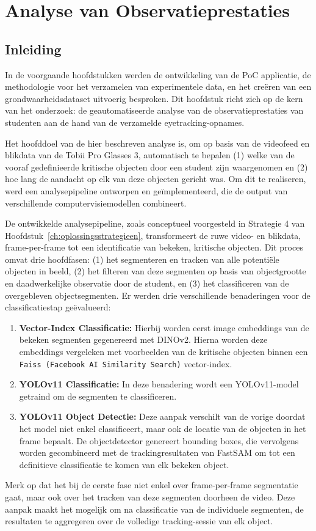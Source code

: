 \chapter{Analyse van Observatieprestaties}
\label{ch:analyse}

\section{Inleiding}

In de voorgaande hoofdstukken werden de ontwikkeling van de PoC applicatie, de methodologie voor het verzamelen 
van experimentele data, en het creëren van een grondwaarheidsdataset uitvoerig besproken. 
Dit hoofdstuk richt zich op de kern van het onderzoek: de geautomatiseerde analyse van de 
observatieprestaties van studenten aan de hand van de verzamelde eyetracking-opnames.

Het hoofddoel van de hier beschreven analyse is, om op basis van de videofeed en blikdata van de Tobii Pro Glasses 3, 
automatisch te bepalen (1) welke van de vooraf gedefinieerde kritische objecten door een student zijn waargenomen en (2) 
hoe lang de aandacht op elk van deze objecten gericht was. 
Om dit te realiseren, werd een analysepipeline ontworpen en geïmplementeerd, die de output van verschillende computervisiemodellen combineert.

De ontwikkelde analysepipeline, zoals conceptueel voorgesteld in Strategie 4 van Hoofdstuk~\ref{ch:oplossingsstrategieen}, 
transformeert de ruwe video- en blikdata, frame-per-frame tot een identificatie van bekeken, kritische objecten. 
Dit proces omvat drie hoofdfasen: (1) het segmenteren en tracken van alle potentiële objecten in beeld, 
(2) het filteren van deze segmenten op basis van objectgrootte en daadwerkelijke observatie door de student, en 
(3) het classificeren van de overgebleven objectsegmenten. 
Er werden drie verschillende benaderingen voor de classificatiestap geëvalueerd:
\begin{enumerate}
  \item \textbf{Vector-Index Classificatie:} Hierbij worden eerst image embeddings van de bekeken segmenten gegenereerd met DINOv2.
  Hierna worden deze embeddings vergeleken met voorbeelden van de kritische objecten binnen een \texttt{Faiss (Facebook AI Similarity Search)} vector-index.
  \item \textbf{YOLOv11 Classificatie:} In deze benadering wordt een YOLOv11-model getraind om de segmenten te classificeren.
  \item \textbf{YOLOv11 Object Detectie:} Deze aanpak verschilt van de vorige doordat het model niet enkel classificeert, 
  maar ook de locatie van de objecten in het frame bepaalt. 
  De objectdetector genereert bounding boxes, die vervolgens worden gecombineerd met de trackingresultaten van FastSAM om tot een definitieve classificatie te komen van elk bekeken object.
\end{enumerate}
Merk op dat het bij de eerste fase niet enkel over frame-per-frame segmentatie gaat, maar ook over het tracken van deze segmenten doorheen de video.
Deze aanpak maakt het mogelijk om na classificatie van de individuele segmenten, de resultaten te aggregeren over de volledige tracking-sessie van elk object. 

